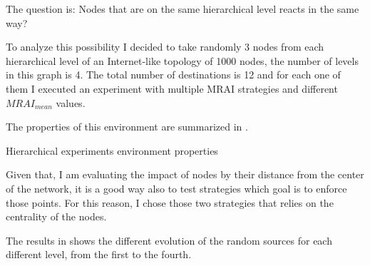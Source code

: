The question is: Nodes that are on the same hierarchical level reacts in the same way?

To analyze this possibility I decided to take randomly \num{3} nodes from each
hierarchical level of an Internet-like topology of \num{1000} nodes, the number
of levels in this graph is \num{4}.
The total number of destinations is \num{12} and for each one of them I executed
an experiment with multiple \ac{MRAI} strategies and different \(MRAI_{mean}\)
values.

The properties of this environment are summarized in .

\begin{table}[h]
	
	\caption{Hierarchical experiments environment properties}
	\label{tbl:hierarchical_properties}
\end{table}

Given that, I am evaluating the impact of nodes by their distance from
the center of the network, it is a good way also to test strategies
which goal is to enforce those points.
For this reason, I chose those two strategies that relies on the centrality of the nodes.

The results in  shows the different evolution of
the random sources for each different level, from the first to the fourth.

